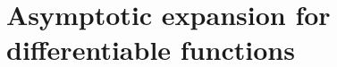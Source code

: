\documentclass[a4paper]{article}
\numberwithin{equation}{section}
\begin{document}
\begin{comment}
\begin{tabular}{|c|c|c|c|c|c|c|c|} \hline
    $u_n$ & $G_\infty$ &  $W_n,W_\infty,N_n,X_n,X_\infty$ &$\psi_n$\\ \hline
    $3$  & $2$  & $2$&$1$\\  \hline
  \end{tabular}  \label{tabledif2p}\end{center}
\end{table}
%
%
\begin{table}[htb]
  \begin{center}
  \caption{Differentiability for $3\times$Lemma \ref{20160920-5}}
\begin{tabular}{|c|c|c|c|c|c|c|c|} \hline
    $u_n$ & $G_\infty$ &  $W_n,W_\infty,N_n,X_n,X_\infty$ &$\psi_n$&
    $\langle D(G_n^{(1)}\psi_n),u_n\rangle$&$\langle D(G_n^{(2)}\psi_n),u_n\rangle$&$\langle D(G_n^{(3)}\psi_n),u_n\rangle$\\ \hline
    $3$  & $1$  & $1$&$1$&$1$ &$1$&$1$\\  \hline
  \end{tabular}  \label{tabledif3}\end{center}
\end{table}
%
%
\begin{table}[htb]
  \begin{center}
  \caption{Differentiability for $3\times$Lemma \ref{20160920-5}}
\begin{tabular}{|c|c|c|c|c|c|c|c|} \hline
    $u_n$ & $G_\infty$ &  $W_n,W_\infty,N_n,X_n,X_\infty$ &$\psi_n$\\ \hline
    $3$  & $3$  & $3$&$2$\\  \hline
  \end{tabular}  \label{tabledif3p}\end{center}
\end{table}
%
\setcounter{table}{0}
For integrability, since the highest-order of products are in 
\beas 
\big\{u_n,G_\infty,W_n,W_\infty,N_n,X_n,X_\infty\text{ and derivatives}\big\}^5\times \big\{\psi_n,D\psi_n\big\}, 
\eeas
we should assume $5p^{-1}+p_1^{-1}\leq1$. 
\end{comment}


\section{Asymptotic expansion for differentiable functions}\label{170813-1}
\end{document}
